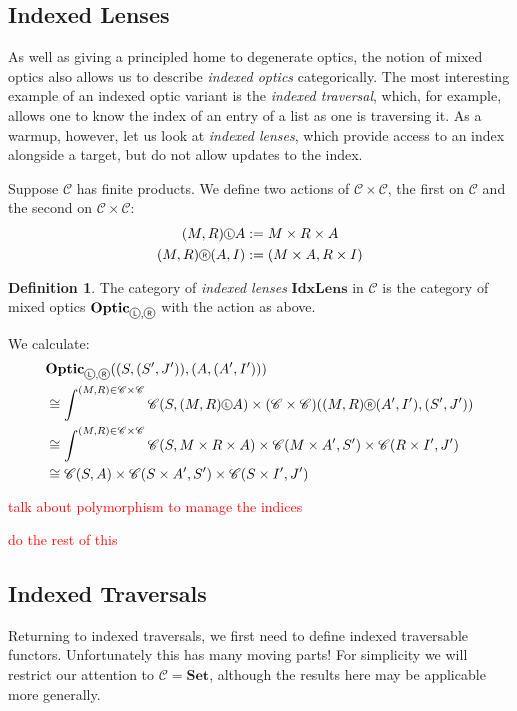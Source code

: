 \documentclass[11pt,letterpaper]{article}
\theoremstyle{plain}
\theoremstyle{definition}
\newtheorem{definition}[theorem]{Definition}
\newcommand{\C}{\mathscr{C}}
\newcommand{\Set}{\mathbf{Set}}
\newcommand{\Optic}{\mathbf{Optic}}
\newcommand{\IdxLens}{\mathbf{IdxLens}}
\newcommand*\circled[1]{\tikz[baseline={([yshift=-0.65ex]current bounding box.center)}]{
   \node[shape=circle,draw,inner sep=1pt] (char) {#1};}}
\newcommand{\actL}{{\circled{\tiny$\mathsf{L}$}}}
\newcommand{\actR}{{\circled{\tiny$\mathsf{R}$}}}
\newcommand{\todo}[1]{\textcolor{red}{\small #1}}
\begin{document}
\subsection{Indexed Lenses}
As well as giving a principled home to degenerate optics, the notion of mixed optics also allows us to describe \emph{indexed optics} categorically. The most interesting example of an indexed optic variant is the \emph{indexed traversal}, which, for example, allows one to know the index of an entry of a list as one is traversing it. As a warmup, however, let us look at \emph{indexed lenses}, which provide access to an index alongside a target, but do not allow updates to the index.

Suppose $\C$ has finite products. We define two actions of $\C \times \C$, the first on $\C$ and the second on $\C \times \C$:
\begin{align*}
(M, R) \actL A &:= M \times R \times A \\
(M, R) \actR (A, I) &:= (M \times A, R \times I)
\end{align*}

\begin{definition}
The category of \emph{indexed lenses} $\IdxLens$ in $\C$ is the category of mixed optics $\Optic_{\actL, \actR}$ with the action as above.
\end{definition}

We calculate:
\begin{align*}
  &\Optic_{\actL, \actR}((S, (S', J')), (A, (A', I'))) \\
  &\cong \int^{(M, R) \in \C \times \C} \C(S, (M, R) \actL A) \times (\C \times \C)((M, R) \actR (A', I'), (S', J')) \\
  &\cong \int^{(M, R) \in \C \times \C} \C(S, M \times R \times A) \times \C(M \times A', S') \times \C(R \times I', J') \\
  &\cong  \C(S, A) \times \C(S \times A', S') \times \C(S \times I', J')
\end{align*}

\todo{talk about polymorphism to manage the indices}

\todo{do the rest of this}

\subsection{Indexed Traversals}

Returning to indexed traversals, we first need to define indexed traversable functors. Unfortunately this has many moving parts! For simplicity we will restrict our attention to $\C = \Set$, although the results here may be applicable more generally.
\end{document}
